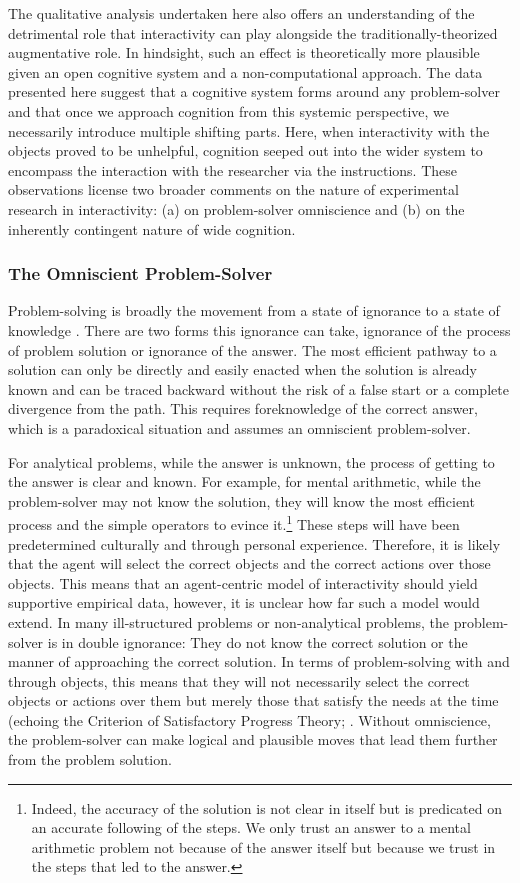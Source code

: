\documentclass{article}
\begin{document}
The qualitative analysis undertaken here also offers an understanding of the detrimental role that interactivity can play alongside the traditionally-theorized augmentative role. In hindsight, such an effect is theoretically more plausible given an open cognitive system and a non-computational approach. The data presented here suggest that a cognitive system forms around any problem-solver and that once we approach cognition from this systemic perspective, we necessarily introduce multiple shifting parts. Here, when interactivity with the objects proved to be unhelpful, cognition seeped out into the wider system to encompass the interaction with the researcher via the instructions. These observations license two broader comments on the nature of experimental research in interactivity: (a) on problem-solver omniscience and (b) on the inherently contingent nature of wide cognition.

\subsubsection{The Omniscient Problem-Solver}

Problem-solving is broadly the movement from a state of ignorance to a state of knowledge \parencite{Arfini2019}. There are two forms this ignorance can take, ignorance of the process of problem solution or ignorance of the answer. The most efficient pathway to a solution can only be directly and easily enacted when the solution is already known and can be traced backward without the risk of a false start or a complete divergence from the path. This requires foreknowledge of the correct answer, which is a paradoxical situation and assumes an omniscient problem-solver.

For analytical problems, while the answer is unknown, the process of getting to the answer is clear and known. For example, for mental arithmetic, while the problem-solver may not know the solution, they will know the most efficient process and the simple operators to evince it.\footnote{Indeed, the accuracy of the solution is not clear in itself but is predicated on an accurate following of the steps. We only trust an answer to a mental arithmetic problem not because of the answer itself but because we trust in the steps that led to the answer.} These steps will have been predetermined culturally and through personal experience. Therefore, it is likely that the agent will select the correct objects and the correct actions over those objects. This means that an agent-centric model of interactivity should yield supportive empirical data, however, it is unclear how far such a model would extend. In many ill-structured problems or non-analytical problems, the problem-solver is in double ignorance: They do not know the correct solution or the manner of approaching the correct solution. In terms of problem-solving with and through objects, this means that they will not necessarily select the correct objects or actions over them but merely those that satisfy the needs at the time (echoing the Criterion of Satisfactory Progress Theory; \parencite{MacGregor2001}\parencite{Ormerod2013}. Without omniscience, the problem-solver can make logical and plausible moves that lead them further from the problem solution. 
\end{document}
